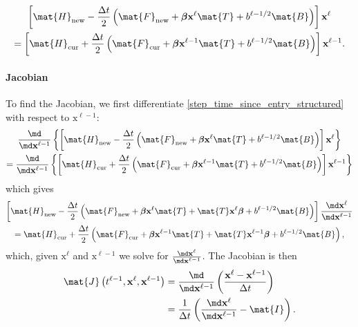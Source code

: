\documentclass{jpmarticle}
\renewcommand{\vec}[1]{\boldsymbol{\mathrm{#1}}}
\let\subequationsorig\subequations%
\let\endsubequationsorig\endsubequations%
\renewenvironment{subequations}{
  \subequationsorig
  \renewcommand{\theequation}{\theparentequation.\arabic{equation}}
}{
  \endsubequationsorig
}
\begin{document}
\begin{subequations}
  \begin{multline}
    \label{step_time_since_entry_structured}
    \left[
      \mat{H}_{\mathrm{new}}
      - \frac{\Delta t}{2}
      \left(
        \mat{F}_{\mathrm{new}}
        + \vec{\beta} \vec{x}^{\ell} \mat{T}
        + b^{\ell - 1 / 2} \mat{B}
      \right)
    \right] \vec{x}^{\ell}
    \\
    = \left[
      \mat{H}_{\mathrm{cur}}
      + \frac{\Delta t}{2}
      \left(
        \mat{F}_{\mathrm{cur}}
        + \vec{\beta} \vec{x}^{\ell - 1} \mat{T}
        + b^{\ell - 1 / 2} \mat{B}
      \right)
    \right] \vec{x}^{\ell - 1}.
  \end{multline}
\end{subequations}


\paragraph{Jacobian}

To find the Jacobian, we first differentiate
\eqref{step_time_since_entry_structured} with respect to
$\vec{x}^{\ell - 1}$:
\begin{multline}
  \frac{\md}{\md \vec{x}^{\ell - 1}}
  \left\{
    \left[
      \mat{H}_{\mathrm{new}}
      - \frac{\Delta t}{2}
      \left(
        \mat{F}_{\mathrm{new}}
        + \vec{\beta} \vec{x}^{\ell} \mat{T}
        + b^{\ell - 1 / 2} \mat{B}
      \right)
    \right]
    \vec{x}^{\ell}
  \right\}
  \\
  = \frac{\md}{\md \vec{x}^{\ell - 1}}
  \left\{
    \left[
      \mat{H}_{\mathrm{cur}}
      + \frac{\Delta t}{2}
      \left(
        \mat{F}_{\mathrm{cur}}
        + \vec{\beta} \vec{x}^{\ell - 1} \mat{T}
        + b^{\ell - 1 / 2} \mat{B}
      \right)
    \right]
    \vec{x}^{\ell - 1}
  \right\}
\end{multline}
which gives
\begin{multline}
  \left[
    \mat{H}_{\mathrm{new}}
    - \frac{\Delta t}{2}
    \left(
      \mat{F}_{\mathrm{new}}
      + \vec{\beta} \vec{x}^{\ell} \mat{T}
      + \mat{T} \vec{x}^{\ell} \vec{\beta}
      + b^{\ell - 1 / 2} \mat{B}
    \right)
  \right]
  \frac{\md \vec{x}^{\ell}}{\md \vec{x}^{\ell - 1}}
  \\
  = \mat{H}_{\mathrm{cur}}
  + \frac{\Delta t}{2}
  \left(
    \mat{F}_{\mathrm{cur}}
    + \vec{\beta} \vec{x}^{\ell - 1} \mat{T}
    + \mat{T} \vec{x}^{\ell - 1} \vec{\beta}
    + b^{\ell - 1 / 2} \mat{B}
  \right),
\end{multline}
which, given $\vec{x}^{\ell}$
and $\vec{x}^{\ell - 1}$
we solve for $\frac{\md \vec{x}^{\ell}}{\md \vec{x}^{\ell - 1}}$.
The Jacobian is then
\begin{equation}
  \begin{split}
    \mat{J}\left(t^{\ell - 1}, \vec{x}^{\ell}, \vec{x}^{\ell - 1}\right)
    &= \frac{\md}{\md \vec{x}^{\ell - 1}}
    \left(
      \frac{\vec{x}^{\ell} - \vec{x}^{\ell - 1}}{\Delta t}
    \right)
    \\
    &= \frac{1}{\Delta t} \left(
      \frac{\md \vec{x}^{\ell}}{\md \vec{x}^{\ell - 1}}
      - \mat{I}
    \right).
  \end{split}
\end{equation}
\end{document}

